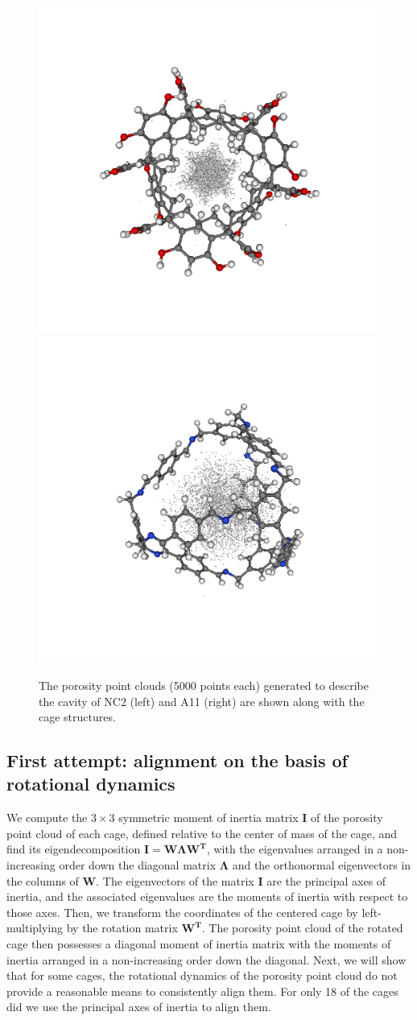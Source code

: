 \documentclass[journal=jacsat,manuscript=article]{achemso}
\begin{document}
{\begin{figure}
\centering
	\includegraphics[width=0.45\columnwidth]{NC2_porosity_point_cloud.png}
	\includegraphics[width=0.45\columnwidth]{A11_porosity_point_cloud.png}
	\caption{{\color{red} The porosity point clouds (5000 points each) generated to describe the cavity of NC2 (left) and A11 (right) are shown along with the cage structures.
	}%
	} \label{fig:porosity_pt_cloud}
\end{figure}

\subsection{First attempt: alignment on the basis of rotational dynamics}
\label{sec:alignment_details}
We compute the $3\times 3$ symmetric moment of inertia matrix $\mathbf{I}$ of the porosity point cloud of each cage, defined relative to the center of mass of the cage, and find its eigendecomposition $\mathbf{I}=\mathbf{W}\mathbf{\Lambda}\mathbf{W^T}$, with the eigenvalues arranged in a non-increasing order down the diagonal matrix $\mathbf{\Lambda}$ and the orthonormal eigenvectors in the columns of $\mathbf{W}$. The eigenvectors of the matrix $\mathbf{I}$ are the principal axes of inertia, and the associated eigenvalues are the moments of inertia with respect to those axes. Then, we transform the coordinates of the centered cage by left-multiplying by the rotation matrix $\mathbf{W^T}$. The porosity point cloud of the rotated cage then possesses a diagonal moment of inertia matrix with the moments of inertia arranged in a non-increasing order down the diagonal. Next, we will show that for some cages, the rotational dynamics of the porosity point cloud do not provide a reasonable means to consistently align them. For only 18 of the cages did we use the principal axes of inertia to align them.


}
\end{document}
